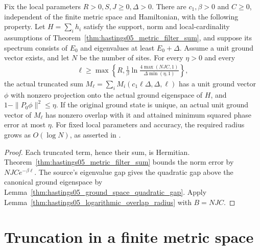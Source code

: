 \begin{lemma}
    \label{thm:hastings05_metric_ground_overlap}
    \leanok
    Fix the local parameters $R>0,S,J\ge0,\Delta>0$. There are
    $c_1,\beta>0$ and $C\ge0$, independent of the finite metric space and
    Hamiltonian, with the following property. Let $H=\sum_i h_i$ satisfy
    the support, norm and local-cardinality assumptions of
    Theorem~\ref{thm:hastings05_metric_filter_sum}, and suppose its spectrum
    consists of $E_0$ and eigenvalues at least $E_0+\Delta$. Assume a unit
    ground vector exists, and let $N$ be the number of sites. For every
    $\eta>0$ and every
    \begin{align}
        \ell\ge\max\left\{R,\frac1\beta
        \ln\frac{4\max(NJC,1)}{\Delta\min(\eta,1)}\right\},
        \label{eq:hastings05_metric_ground_overlap_radius}
    \end{align}
    the actual truncated sum
    $M_\ell=\sum_i M_i(c_1\ell\Delta,\Delta,\ell)$ has a unit ground vector
    $\phi$ with nonzero projection onto the actual ground eigenspace of
    $H$, and $1-\|P_0\phi\|^2\le\eta$. If the original ground state is
    unique, an actual unit ground vector of $M_\ell$ has nonzero overlap
    with it and attained minimum squared phase error at most $\eta$.
    For fixed local parameters and accuracy, the required radius grows
    as $O(\log N)$, as asserted in
    \cite[lines 362--367]{Hastings2006Solving}.
\end{lemma}
\begin{proof}\leanok
    Each truncated term, hence their sum, is Hermitian.
    Theorem~\ref{thm:hastings05_metric_filter_sum} bounds the norm error by
    $NJC e^{-\beta\ell}$. The source's eigenvalue gap gives the quadratic
    gap above the canonical ground eigenspace by
    Lemma~\ref{thm:hastings05_ground_space_quadratic_gap}. Apply
    Lemma~\ref{thm:hastings05_logarithmic_overlap_radius} with $B=NJC$.
\end{proof}


\section{Truncation in a finite metric space}
\label{sec:gaussian_filtered_metric_localization}

